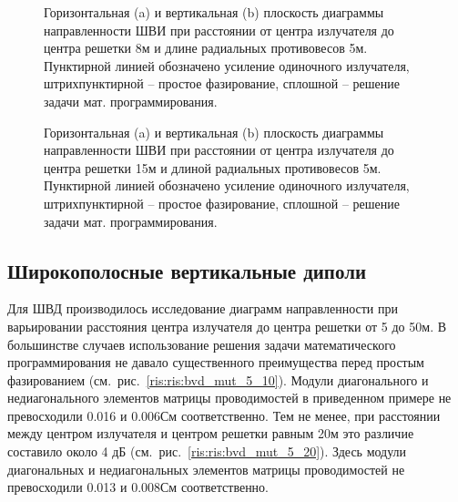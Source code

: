 \begin{figure}
\begin{minipage}[h]{0.49\linewidth}
\end{minipage}
\hfill
\begin{minipage}[h]{0.49\linewidth}
\end{minipage}
\caption{Горизонтальная (a) и вертикальная (b) плоскость диаграммы направленности ШВИ при расстоянии от центра излучателя до центра решетки 8м и длине радиальных противовесов 5м. Пунктирной линией обозначено усиление одиночного излучателя, штрихпунктирной -- простое фазирование, сплошной -- решение задачи мат. программирования.}
\label{ris:bve_mut_5_8}
\end{figure}

\begin{figure}
\begin{minipage}[h]{0.49\linewidth}
\end{minipage}
\hfill
\begin{minipage}[h]{0.49\linewidth}
\end{minipage}
\caption{Горизонтальная (a) и вертикальная (b) плоскость диаграммы направленности ШВИ при расстоянии от центра излучателя до центра решетки 15м и длиной радиальных противовесов 5м. Пунктирной линией обозначено усиление одиночного излучателя, штрихпунктирной -- простое фазирование, сплошной -- решение задачи мат. программирования.}
\label{ris:bve_mut_5_15}
\end{figure}

\subsection{Широкополосные вертикальные диполи}

Для ШВД производилось исследование диаграмм направленности при варьировании расстояния центра излучателя до центра решетки от 5 до 50м. В большинстве случаев использование решения задачи математического программирования не давало существенного преимущества перед простым фазированием (см.~рис.~\ref{ris:ris:bvd_mut_5_10}). Модули диагонального и недиагонального элементов матрицы проводимостей в приведенном примере не превосходили 0.016 и 0.006См соответственно.  Тем не менее, при расстоянии между центром излучателя и центром решетки равным 20м это различие составило около 4 дБ (см.~рис.~\ref{ris:ris:bvd_mut_5_20}). Здесь модули диагональных и недиагональных элементов матрицы проводимостей не превосходили 0.013 и 0.008См соответственно.

